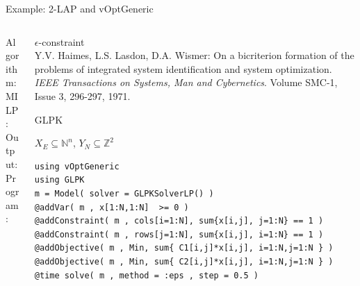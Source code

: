\documentclass[10pt,xcolor=dvipsnames]{beamer}
\newcommand{\mN}{\mathbb{N}}
\newcommand{\Z}{\mathbb{Z}}
\begin{document}
\begin{frame}[fragile=singleslide]{Example: 2-LAP and vOptGeneric}

\vspace{5mm}
\begin{columns}
%
\begin{column}{0.2\textwidth}
Algorithm: \\
\vspace{18mm}
MILP:\\  
\vspace{2mm}
Output: \\
\vspace{6mm}
Program:
\vspace{30mm}
\end{column}
\begin{column}{0.8\textwidth}
         $\epsilon$-constraint \vspace{1mm}\\
         {\footnotesize Y.V. Haimes, L.S. Lasdon, D.A. Wismer: On a bicriterion formation of the problems of integrated system identification and system optimization. 
         \textit{IEEE Transactions on Systems, Man and Cybernetics}. Volume SMC-1, Issue 3, 296-297, 1971.\\}
\medskip

         GLPK
\medskip

$X_E \subseteq \mN^n$, $Y_N \subseteq \Z^2$
\vspace{3mm}

{\footnotesize
\begin{verbatim}
using vOptGeneric
using GLPK
m = Model( solver = GLPKSolverLP() )
@addVar( m , x[1:N,1:N]  >= 0 )
@addConstraint( m , cols[i=1:N], sum{x[i,j], j=1:N} == 1 )
@addConstraint( m , rows[j=1:N], sum{x[i,j], i=1:N} == 1 )
@addObjective( m , Min, sum{ C1[i,j]*x[i,j], i=1:N,j=1:N } )
@addObjective( m , Min, sum{ C2[i,j]*x[i,j], i=1:N,j=1:N } )
@time solve( m , method = :eps , step = 0.5 )
\end{verbatim}
}
          
\end{column}
%
\end{columns}         

       
\end{frame}
\end{document}
